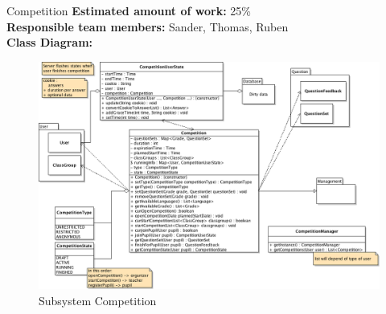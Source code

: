 \begin{subsection}{Competition}
	\textbf{Estimated amount of work:} 25\% \\
	\textbf{Responsible team members:} Sander, Thomas, Ruben \\
	\textbf{Class Diagram:} \\
	
	\begin{figure}[h]
	  \centering
		\includegraphics[width=1\textwidth]{../class_diagrams/competition.png}
	  \caption{Subsystem Competition}
	  \label{subsystem_competition}
	\end{figure}
	
\end{subsection}